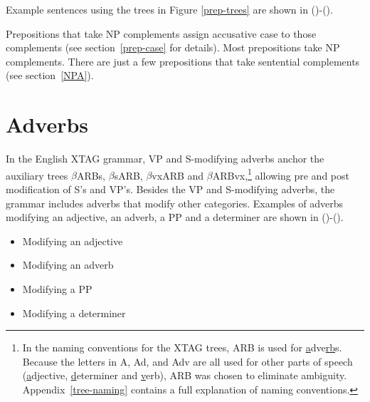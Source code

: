 Example sentences using the trees in Figure \ref{prep-trees} are shown
in ()-().



Prepositions that take NP complements assign accusative case to those
complements (see section~\ref{prep-case} for details).  Most prepositions take
NP complements.  There are just a few prepositions that take sentential
complements (see section~\ref{NPA}).



\section{Adverbs}
\label{adv-modifier}

In the English XTAG grammar, VP and S-modifying adverbs anchor the auxiliary
trees $\beta$ARBs, $\beta$sARB, $\beta$vxARB and $\beta$ARBvx,\footnote{In
the naming conventions for the XTAG trees, ARB is used for {\underline
a}dve{\underline {rb}}s.  Because the letters in A, Ad, and Adv are all used
for other parts of speech ({\underline a}djective, {\underline d}eterminer and
{\underline v}erb), ARB was chosen to eliminate ambiguity.
Appendix~\ref{tree-naming} contains a full explanation of naming conventions.}
allowing pre and post modification of S's and VP's.  Besides the VP and
S-modifying adverbs, the grammar includes adverbs that modify other
categories. Examples of adverbs modifying an adjective, an adverb, a PP and a
determiner are shown in ()-().

\begin{itemize}
\item{Modifying an adjective}

\item{Modifying an adverb}

\item{Modifying a PP}

\item{Modifying a determiner}

\end{itemize}

